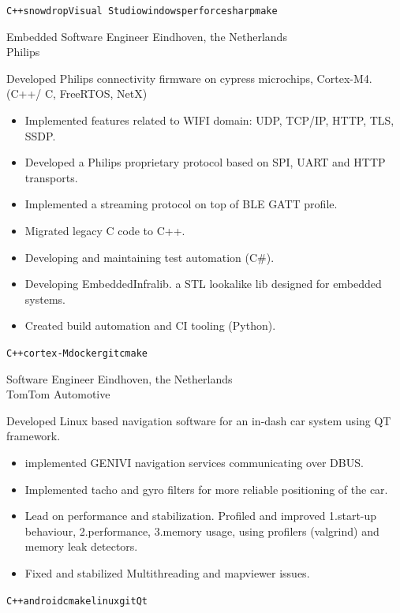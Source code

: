 \documentclass[9pt]{developercv} %
\begin{document}
\begin{entrylist}
{\begin{itemize}
         \end{itemize}
        \texttt{C++}\slashsep\texttt{snowdrop}\slashsep\texttt{Visual Studio}\slashsep\texttt{windows}\slashsep\texttt{perforce}\slashsep\texttt{sharpmake}
        }
	\entry
		{}
        {Embedded Software Engineer}
        {Eindhoven, the Netherlands\\Philips}
        {Developed Philips connectivity firmware on cypress microchips, Cortex-M4.(C++/ C, FreeRTOS, NetX)
          \begin{itemize}
           \setlength\itemsep{-0.5em}
            \item {Implemented features related to WIFI domain: UDP, TCP/IP, HTTP, TLS, SSDP.}
            \item {Developed a Philips proprietary protocol based on SPI, UART and HTTP transports.}
            \item {Implemented a streaming protocol on top of BLE GATT profile.}
            \item {Migrated legacy C code to C++.}
            \item {Developing and maintaining test automation (C\#).}
            \item {Developing EmbeddedInfralib. a STL lookalike lib designed for embedded systems.}
            \item {Created build automation and CI tooling (Python).}
          \end{itemize}
        \texttt{C++}\slashsep\texttt{cortex-M}\slashsep\texttt{docker}\slashsep\texttt{git}\slashsep\texttt{cmake}
        }
	\entry
		{}
        {Software Engineer}
        {Eindhoven, the Netherlands\\TomTom Automotive}
        {Developed Linux based navigation software for an in-dash car system using QT framework.
         \begin{itemize}
           \setlength\itemsep{-0.5em}
            \item {implemented GENIVI navigation services communicating over DBUS.}
            \item {Implemented tacho and gyro filters for more reliable positioning of the car. }
            \item {Lead on performance and stabilization. Profiled and improved 1.start-up behaviour, 2.performance, 3.memory usage, using profilers (valgrind) and memory leak detectors.}
            \item {Fixed and stabilized Multithreading and mapviewer issues.}
          \end{itemize}
        \texttt{C++}\slashsep\texttt{android}\slashsep\texttt{cmake}\slashsep\texttt{linux}\slashsep\texttt{git}\slashsep\texttt{Qt}
        }
\end{entrylist}
\end{document}
